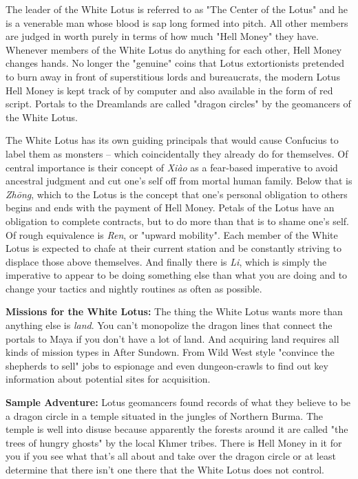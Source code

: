 The leader of the White Lotus is referred to as "The Center of the Lotus" and he is a venerable man whose blood is sap long formed into pitch. All other members are judged in worth purely in terms of how much "Hell Money" they have. Whenever members of the White Lotus do anything for each other, Hell Money changes hands. No longer the "genuine" coins that Lotus extortionists pretended to burn away in front of superstitious lords and bureaucrats, the modern Lotus Hell Money is kept track of by computer and also available in the form of red script. Portals to the Dreamlands are called "dragon circles" by the geomancers of the White Lotus.

The White Lotus has its own guiding principals that would cause Confucius to label them as monsters -- which coincidentally they already do for themselves. Of central importance is their concept of \textit{Xi\`{a}o} as a fear-based imperative to avoid ancestral judgment and cut one's self off from mortal human family. Below that is \textit{Zh\={o}ng}, which to the Lotus is the concept that one's personal obligation to others begins and ends with the payment of Hell Money. Petals of the Lotus have an obligation to complete contracts, but to do more than that is to shame one's self. Of rough equivalence is \textit{Ren}, or "upward mobility". Each member of the White Lotus is expected to chafe at their current station and be constantly striving to displace those above themselves. And finally there is \textit{Li}, which is simply the imperative to appear to be doing something else than what you are doing and to change your tactics and nightly routines as often as possible.

\textbf{Missions for the White Lotus:} The thing the White Lotus wants more than anything else is \textit{land}. You can't monopolize the dragon lines that connect the portals to Maya if you don't have a lot of land. And acquiring land requires all kinds of mission types in After Sundown. From Wild West style "convince the shepherds to sell" jobs to espionage and even dungeon-crawls to find out key information about potential sites for acquisition.

\textbf{Sample Adventure:} Lotus geomancers found records of what they believe to be a dragon circle in a temple situated in the jungles of Northern Burma. The temple is well into disuse because apparently the forests around it are called "the trees of hungry ghosts" by the local Khmer tribes. There is Hell Money in it for you if you see what that's all about and take over the dragon circle or at least determine that there isn't one there that the White Lotus does not control.


